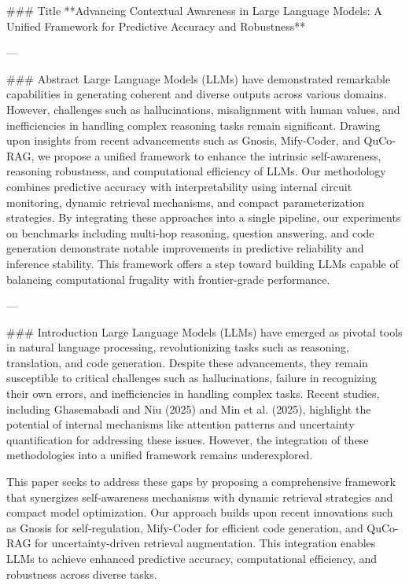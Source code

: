 ### Title  
**Advancing Contextual Awareness in Large Language Models: A Unified Framework for Predictive Accuracy and Robustness**

---

### Abstract  
Large Language Models (LLMs) have demonstrated remarkable capabilities in generating coherent and diverse outputs across various domains. However, challenges such as hallucinations, misalignment with human values, and inefficiencies in handling complex reasoning tasks remain significant. Drawing upon insights from recent advancements such as Gnosis, Mify-Coder, and QuCo-RAG, we propose a unified framework to enhance the intrinsic self-awareness, reasoning robustness, and computational efficiency of LLMs. Our methodology combines predictive accuracy with interpretability using internal circuit monitoring, dynamic retrieval mechanisms, and compact parameterization strategies. By integrating these approaches into a single pipeline, our experiments on benchmarks including multi-hop reasoning, question answering, and code generation demonstrate notable improvements in predictive reliability and inference stability. This framework offers a step toward building LLMs capable of balancing computational frugality with frontier-grade performance.

---

### Introduction  
Large Language Models (LLMs) have emerged as pivotal tools in natural language processing, revolutionizing tasks such as reasoning, translation, and code generation. Despite these advancements, they remain susceptible to critical challenges such as hallucinations, failure in recognizing their own errors, and inefficiencies in handling complex tasks. Recent studies, including Ghasemabadi and Niu (2025) and Min et al. (2025), highlight the potential of internal mechanisms like attention patterns and uncertainty quantification for addressing these issues. However, the integration of these methodologies into a unified framework remains underexplored.

This paper seeks to address these gaps by proposing a comprehensive framework that synergizes self-awareness mechanisms with dynamic retrieval strategies and compact model optimization. Our approach builds upon recent innovations such as Gnosis for self-regulation, Mify-Coder for efficient code generation, and QuCo-RAG for uncertainty-driven retrieval augmentation. This integration enables LLMs to achieve enhanced predictive accuracy, computational efficiency, and robustness across diverse tasks.

